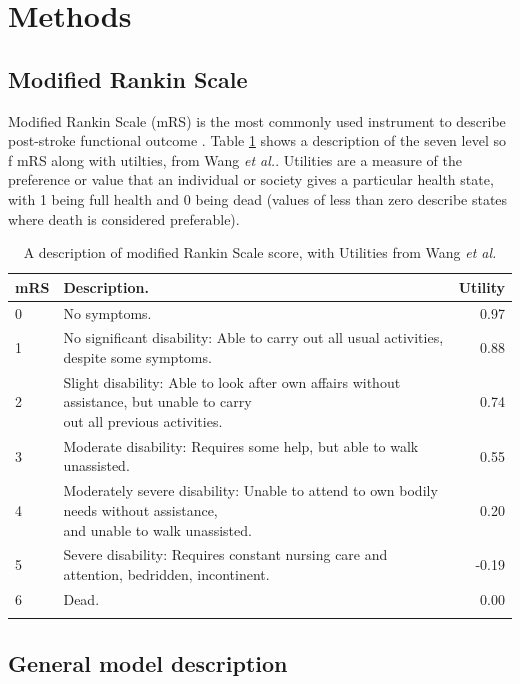 \section{Methods}

\subsection{Modified Rankin Scale}

Modified Rankin Scale (mRS) is the most commonly used instrument to describe post-stroke functional outcome \cite{quinn_functional_2009}. Table \ref{tab:mrs} shows a description of the seven level so f mRS along with utilties, from Wang \emph{et al.}\cite{wang_utility-weighted_2020}. Utilities are a measure of the preference or value that an individual or society gives a particular health state, with 1 being full health and 0 being dead (values of less than zero describe states where death is considered preferable).

\begin{minipage}{\textwidth}
\renewcommand*{\arraystretch}{2.0} %
\begin{longtable}[]{@{}llr@{}}
\caption{A description of modified Rankin Scale score, with Utilities from Wang \emph{et al.}\cite{wang_utility-weighted_2020}}\\
\toprule
mRS & Description. & Utility\tabularnewline
\midrule
\endhead
0 & No symptoms. & 0.97\tabularnewline
1 & No significant disability: Able to carry out all usual activities,
despite some symptoms. & 0.88\tabularnewline
2 & \makecell[l]{Slight disability: Able to look after own affairs without assistance, but unable to carry \\ out all previous activities.} &
0.74\tabularnewline
3 & Moderate disability: Requires some help, but able to walk
unassisted. & 0.55\tabularnewline
4 & \makecell[l]{Moderately severe disability: Unable to attend to own bodily needs without assistance, \\ and unable to walk unassisted.} & 0.20\tabularnewline
5 & Severe disability: Requires constant nursing care and attention,
bedridden, incontinent. & -0.19\tabularnewline
6 & Dead. & 0.00\tabularnewline
\bottomrule
\label{tab:mrs}
\end{longtable}
\end{minipage}

\subsection{General model description}

